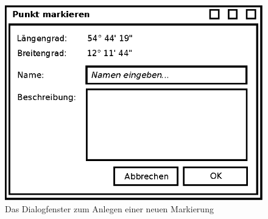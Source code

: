 \documentclass[10pt]{scrreprt}
\begin{document}
\begin{figure}
	\centering
	\includegraphics[scale=0.9]{GUI-Markieren.eps}
	\caption{Das Dialogfenster zum Anlegen einer neuen Markierung}
\end{figure}
\end{document}
